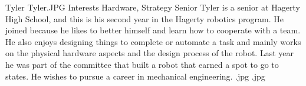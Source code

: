 \insertbio
{Tyler}
{Tyler.JPG}
{Interests}
{Hardware, Strategy}
{Senior}
{  
Tyler is a senior at Hagerty High School, and this is his second year in the Hagerty robotics program. He joined because he likes to better himself and learn how to cooperate with a team. He also enjoys designing things to complete or automate a task and mainly works on the physical hardware aspects and the design process of the robot. Last year he was part of the committee that built a robot that earned a spot to go to states. He wishes to pursue a career in mechanical engineering. 
}
{.jpg}
{.jpg}